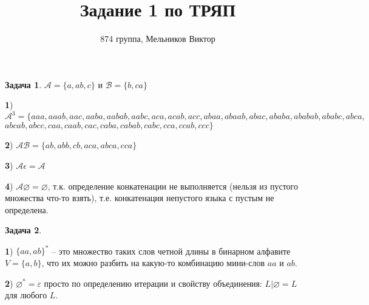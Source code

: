 \documentclass[12pt]{article}
\theoremstyle{definition}
\newtheorem{task}{Задача}
\begin{document}
 
\title{Задание 1 по ТРЯП}
\author{874 группа, Мельников Виктор}
 
 
\date{} 
\maketitle


\begin{task} $\mathcal{A} = \{ a, ab, c \}$ и $\mathcal{B} = \{ b, ca \}$
\textit{}

\textbf{1}) $\mathcal{A}^3 = \{ aaa, aaab, aac, aaba, aabab, aabc, aca, acab, acc, abaa, abaab, abac, ababa, ababab, ababc, abca,$ $abcab, abcc, caa, caab, cac, caba, cabab, cabc, cca, ccab, ccc \}$

\textbf{2}) $\mathcal{A}\mathcal{B} = \{ ab, abb, cb, aca, abca, cca  \} $

\textbf{3}) $\mathcal{A}\epsilon = \mathcal{A}$

\textbf{4}) $\mathcal{A} \varnothing = \varnothing$, т.к. определение конкатенации не выполняется (нельзя из пустого множества что-то взять), т.е. конкатенация непустого языка с пустым не определена.
\end{task}


\begin{task}
\textit{}

\textbf{1}) $\{ aa, ab \}^*$ -- это множество таких слов четной длины в бинарном алфавите $V = \{a, b\}$, что их можно разбить на какую-то комбинацию мини-слов $aa$ и $ab$.

\textbf{2}) $\varnothing^* = {\varepsilon}$ просто по определению итерации и свойству объединения: $L|\varnothing = L$ для любого $L$.
\end{task}
\end{document}
